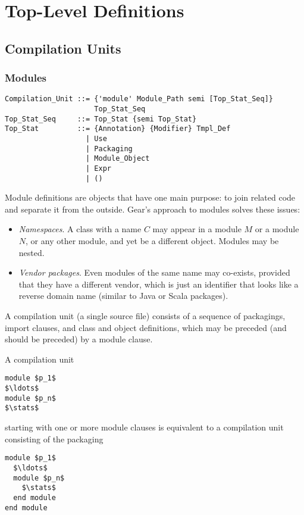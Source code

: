
\chapter{Top-Level Definitions}

\section{Compilation Units}
\label{sec:compilation-units}

\subsection{Modules}
\label{sec:modules}

\syntax\begin{lstlisting}
Compilation_Unit ::= {'module' Module_Path semi [Top_Stat_Seq]} 
                     Top_Stat_Seq
Top_Stat_Seq     ::= Top_Stat {semi Top_Stat}
Top_Stat         ::= {Annotation} {Modifier} Tmpl_Def
                   | Use
                   | Packaging
                   | Module_Object
                   | Expr
                   | ()
\end{lstlisting}

Module definitions are objects that have one main purpose: to join related code and separate it from the outside. Gear's approach to modules solves these issues: 
\begin{itemize}
  \item {\em Namespaces}. A class with a name $C$ may appear in a module $M$ or a module $N$, or any other module, and yet be a different object. Modules may be nested.
  \item {\em Vendor packages}. Even modules of the same name may co-exists, provided that they have a different vendor, which is just an identifier that looks like a reverse domain name (similar to Java or Scala packages). 
\end{itemize}

A compilation unit (a single source file) consists of a sequence of packagings, import clauses, and class and object definitions, which may be preceded (and should be preceded) by a module clause. 

A compilation unit 
\begin{lstlisting}
module $p_1$
$\ldots$
module $p_n$
$\stats$
\end{lstlisting}
starting with one or more module clauses is equivalent to a compilation unit consisting of the packaging
\begin{lstlisting}
module $p_1$
  $\ldots$
  module $p_n$
    $\stats$
  end module
end module
\end{lstlisting}

